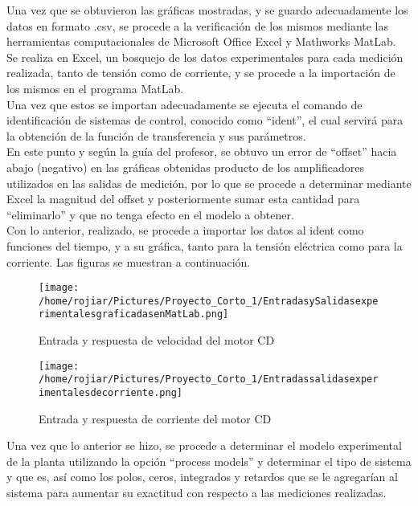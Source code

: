 \documentclass[a4paper,10pt,twocolumn]{article}
\begin{document}
Una vez que se obtuvieron las gráficas mostradas, y se guardo adecuadamente los datos en formato .csv, se procede a la verificación de los mismos 
mediante las herramientas computacionales de Microsoft Office Excel y Mathworks MatLab.\\

Se realiza en Excel, un bosquejo de los datos experimentales para cada medición realizada, tanto de tensión como de corriente, y se procede a 
la importación de los mismos en el programa MatLab. \\

Una vez que estos se importan adecuadamente se ejecuta el comando de identificación de sistemas de control, conocido como ``ident'', el cual 
servirá para la obtención de la función de transferencia y sus parámetros.\\

En este punto y según la guía del profesor, se obtuvo un error de ``offset'' hacia abajo (negativo) en las gráficas obtenidas producto de los amplificadores utilizados en
las salidas de medición, por lo que se procede a determinar mediante Excel la magnitud del offset y posteriormente sumar esta cantidad para ``eliminarlo'' 
y que no tenga efecto en el modelo a obtener.\\

Con lo anterior, realizado, se procede a importar los datos al ident como funciones del tiempo, y a su gráfica, tanto para la tensión eléctrica 
como para la corriente. Las figuras se muestran a continuación.\\

\newpage

\begin{figure}[h]
\centering
\texttt{[image: /home/rojiar/Pictures/Proyecto\_Corto\_1/EntradasySalidasexperimentalesgraficadasenMatLab.png]}
\caption{Entrada y respuesta de velocidad del motor CD}
\label{Entrada y respuesta de velocidad del motor CD}
\end{figure}

\begin{figure}[h]
\centering
\texttt{[image: /home/rojiar/Pictures/Proyecto\_Corto\_1/Entradassalidasexperimentalesdecorriente.png]}
\caption{Entrada y respuesta de corriente del motor CD}
\label{Entrada y respuesta de corriente del motor CD}
\end{figure}

Una vez que lo anterior se hizo, se procede a determinar el modelo experimental de la planta utilizando la opción ``process models'' y determinar
el tipo de sistema y que es, así como los polos, ceros, integrados y retardos que se le agregarían al sistema para aumentar su exactitud con respecto
a las mediciones realizadas.\\
\end{document}
